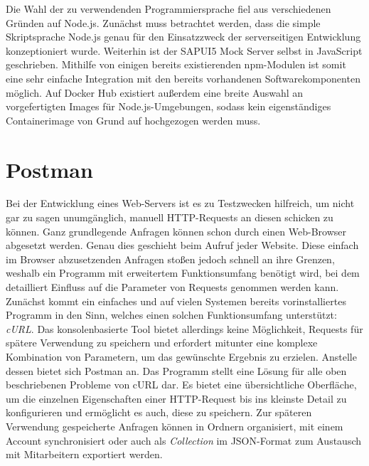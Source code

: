 Die Wahl der zu verwendenden Programmiersprache fiel aus verschiedenen Gründen auf Node.js.
Zunächst muss betrachtet werden, dass die simple Skriptsprache Node.js genau für den Einsatzzweck der serverseitigen Entwicklung konzeptioniert wurde.
Weiterhin ist der SAPUI5 Mock Server selbst in JavaScript geschrieben.
Mithilfe von einigen bereits existierenden \ac{npm}-Modulen ist somit eine sehr einfache Integration mit den bereits vorhandenen Softwarekomponenten möglich.
Auf Docker Hub existiert außerdem eine breite Auswahl an vorgefertigten Images für Node.js-Umgebungen, sodass kein eigenständiges Containerimage von Grund auf hochgezogen werden muss.


\section{Postman}
Bei der Entwicklung eines Web-Servers ist es zu Testzwecken hilfreich, um nicht gar zu sagen unumgänglich, manuell \ac{HTTP}-Requests an diesen schicken zu können.
Ganz grundlegende Anfragen können schon durch einen Web-Browser abgesetzt werden.
Genau dies geschieht beim Aufruf jeder Website.
Diese einfach im Browser abzusetzenden Anfragen stoßen jedoch schnell an ihre Grenzen, weshalb ein Programm mit erweitertem Funktionsumfang benötigt wird, bei dem detailliert Einfluss auf die Parameter von Requests genommen werden kann.
Zunächst kommt ein einfaches und auf vielen Systemen bereits vorinstalliertes Programm in den Sinn, welches einen solchen Funktionsumfang unterstützt: \emph{cURL}.
Das konsolenbasierte Tool bietet allerdings keine Möglichkeit, Requests für spätere Verwendung zu speichern und erfordert mitunter eine komplexe Kombination von Parametern, um das gewünschte Ergebnis zu erzielen.
Anstelle dessen bietet sich Postman an.
Das Programm stellt eine Lösung für alle oben beschriebenen Probleme von cURL dar.
Es bietet eine übersichtliche Oberfläche, um die einzelnen Eigenschaften einer \ac{HTTP}-Request bis ins kleinste Detail zu konfigurieren und ermöglicht es auch, diese zu speichern.
Zur späteren Verwendung gespeicherte Anfragen können in Ordnern organisiert, mit einem Account synchronisiert oder auch als \emph{Collection} im \ac{JSON}-Format zum Austausch mit Mitarbeitern exportiert werden.

